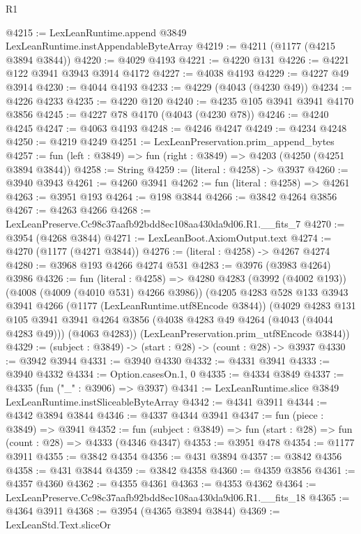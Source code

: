 \begin{lexlean}{R1}
\begin{coremodule}
@4215 := LexLeanRuntime.append @3849 LexLeanRuntime.instAppendableByteArray
@4219 := @4211 (@1177 (@4215 @3894 @3844))
@4220 := @4029 @4193
@4221 := @4220 @131
@4226 := @4221 @122 @3941 @3943 @3914 @4172
@4227 := @4038 @4193
@4229 := @4227 @49 @3914
@4230 := @4044 @4193
@4233 := @4229 (@4043 (@4230 @49))
@4234 := @4226 @4233
@4235 := @4220 @120
@4240 := @4235 @105 @3941 @3941 @4170 @3856
@4245 := @4227 @78 @4170 (@4043 (@4230 @78))
@4246 := @4240 @4245
@4247 := @4063 @4193
@4248 := @4246 @4247
@4249 := @4234 @4248
@4250 := @4219 @4249
@4251 := LexLeanPreservation.prim_append_bytes
@4257 := fun (left : @3849) => fun (right : @3849) => @4203 (@4250 (@4251 @3894 @3844))
@4258 := String
@4259 := (literal : @4258) -> @3937
@4260 := @3940 @3943
@4261 := @4260 @3941
@4262 := fun (literal : @4258) => @4261
@4263 := @3951 @193
@4264 := @198 @3844
@4266 := @3842 @4264 @3856
@4267 := @4263 @4266
@4268 := LexLeanPreserve.Cc98c37aafb92bdd8ec108aa430da9d06.R1.__fits_7
@4270 := @3954 (@4268 @3844)
@4271 := LexLeanBoot.AxiomOutput.text
@4274 := @4270 (@1177 (@4271 @3844))
@4276 := (literal : @4258) -> @4267 @4274
@4280 := @3968 @193 @4266 @4274 @531
@4283 := @3976 (@3983 @4264) @3986
@4326 := fun (literal : @4258) =>
  @4280
    @4283
    (@3992 (@4002 @193))
    (@4008 (@4009 (@4010 @531) @4266 @3986))
    (@4205
      @4283
      @528
      @133
      @3943
      @3941
      @4266
      (@1177 (LexLeanRuntime.utf8Encode @3844))
      (@4029
        @4283
        @131
        @105
        @3941
        @3941
        @4264
        @3856
        (@4038 @4283 @49 @4264 (@4043 (@4044 @4283 @49)))
        (@4063 @4283))
      (LexLeanPreservation.prim_utf8Encode @3844))
@4329 := (subject : @3849) -> (start : @28) -> (count : @28) -> @3937
@4330 := @3942 @3944
@4331 := @3940 @4330
@4332 := @4331 @3941
@4333 := @3940 @4332
@4334 := Option.casesOn.{1, 0}
@4335 := @4334 @3849
@4337 := @4335 (fun ("_" : @3906) => @3937)
@4341 := LexLeanRuntime.slice @3849 LexLeanRuntime.instSliceableByteArray
@4342 := @4341 @3911
@4344 := @4342 @3894 @3844
@4346 := @4337 @4344 @3941
@4347 := fun (piece : @3849) => @3941
@4352 := fun (subject : @3849) => fun (start : @28) => fun (count : @28) => @4333 (@4346 @4347)
@4353 := @3951 @478
@4354 := @1177 @3911
@4355 := @3842 @4354
@4356 := @431 @3894
@4357 := @3842 @4356
@4358 := @431 @3844
@4359 := @3842 @4358
@4360 := @4359 @3856
@4361 := @4357 @4360
@4362 := @4355 @4361
@4363 := @4353 @4362
@4364 := LexLeanPreserve.Cc98c37aafb92bdd8ec108aa430da9d06.R1.__fits_18
@4365 := @4364 @3911
@4368 := @3954 (@4365 @3894 @3844)
@4369 := LexLeanStd.Text.sliceOr

\end{coremodule}
\end{lexlean}
